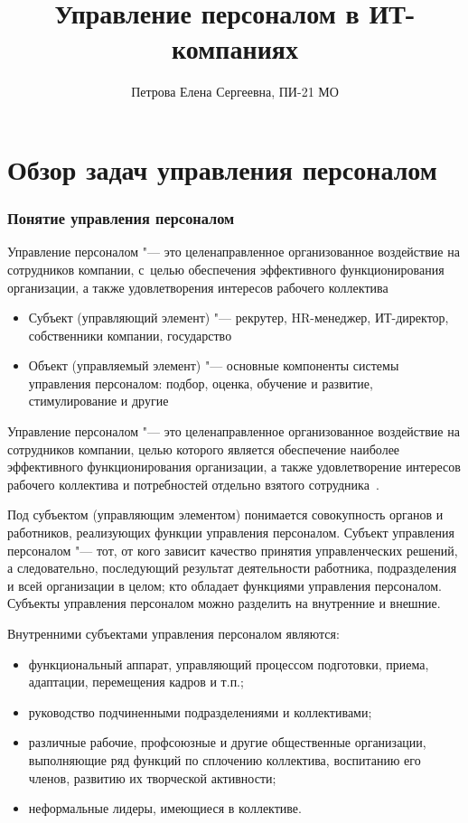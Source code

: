 \documentclass{../industrial-development}
\title{Управление персоналом в ИТ-компаниях}
\author{Петрова Елена Сергеевна, ПИ-21 МО}
\date{}
\begin{document}
\begin{frame}
  \titlepage
\end{frame}

\section{Обзор задач управления персоналом}

\begin{frame} \frametitle{Понятие управления персоналом}
  \begin{block}{}
     \alert{Управление персоналом} "--- это целенаправленное организованное воздействие на сотрудников компании, с~целью обеспечения эффективного функционирования организации, а также удовлетворения интересов рабочего коллектива
  \end{block}
  
  \begin{itemize}
  \item Субъект (управляющий элемент) "--- рекрутер, HR-менеджер, ИТ-директор, собственники компании, государство
  \item Объект (управляемый элемент) "--- основные компоненты системы управления персоналом: подбор, оценка, обучение и развитие, стимулирование и другие 
    \end{itemize}
\end{frame}

\lecturenotes

\alert{Управление персоналом} "--- это целенаправленное организованное воздействие на сотрудников компании, целью которого является обеспечение наиболее эффективного функционирования организации, а также удовлетворение интересов рабочего коллектива и потребностей отдельно взятого сотрудника~\cite[с.~136]{Bazarov}.

Под \alert{субъектом (управляющим элементом)} понимается совокупность органов и работников, реализующих функции управления персоналом. Субъект управления персоналом "--- тот, от кого зависит качество принятия управленческих решений, а следовательно, последующий результат деятельности работника, подразделения и всей организации в целом; кто обладает функциями управления персоналом. Субъекты  управления персоналом можно разделить на внутренние и внешние. 

Внутренними субъектами управления персоналом являются:
\begin{itemize} 
\item	функциональный аппарат, управляющий процессом подготовки, приема, адаптации, перемещения кадров и т.п.;
\item руководство подчиненными подразделениями и коллективами; 
\item	различные рабочие, профсоюзные и другие общественные организации, выполняющие ряд функций по сплочению коллектива, воспитанию его членов, развитию их творческой активности; 
\item	неформальные лидеры, имеющиеся в коллективе. 
\end{itemize} 
\end{document}
